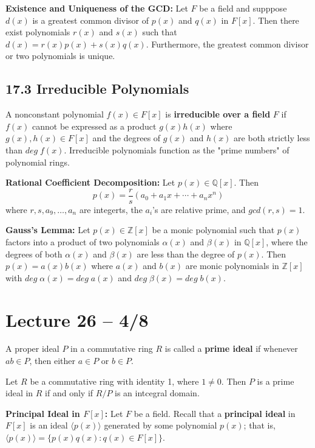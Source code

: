 \documentclass{article}
\newcommand{\Z}{\mathbb{Z}}
\newcommand{\Q}{\mathbb{Q}}
\begin{document}
\begin{theorem}
  \textbf{Existence and Uniqueness of the GCD: }Let $F$ be a field and supppose $d(x)$ is a greatest common divisor of $p(x)$ and $q(x)$ in $F[x]$. Then there exist polynomials $r(x)$ and $s(x)$ such that $d(x)=r(x)p(x)+s(x)q(x)$. Furthermore, the greatest common divisor or two polynomials is unique.
\end{theorem}

\subsection{17.3 Irreducible Polynomials}
A nonconstant polynomial $f(x)\in F[x]$ is \textbf{irreducible over a field} $F$ if $f(x)$ cannot be expressed as a product $g(x)h(x)$ where $g(x), h(x)\in F[x]$ and the degrees of $g(x)$ and $h(x)$ are both strictly less than $deg\;f(x)$. Irreducible polynomials function as the "prime numbers" of polynomial rings.

\begin{theorem}
  \textbf{Rational Coefficient Decomposition: }Let $p(x)\in\Q[x]$. Then \[p(x)=\frac{r}{s}(a_0+a_1x+\cdots+a_nx^n)\] where $r,s,a_9,\dots,a_n$ are integerts, the $a_i$'s are relative prime, and $gcd(r,s)=1$.
\end{theorem}

\begin{theorem}
  \textbf{Gauss's Lemma: }Let $p(x)\in\Z[x]$ be a monic polynomial such that $p(x)$ factors into a product of two polynomials $\alpha(x)$ and $\beta(x)$ in $\Q[x]$, where the degrees of both $\alpha(x)$ and $\beta(x)$ are less than the degree of $p(x)$. Then $p(x)=a(x)b(x)$ where $a(x)$ and $b(x)$ are monic polynomials in $\Z[x]$ with $deg\;\alpha(x)=deg\;a(x)$ and $deg\;\beta(x)=deg\;b(x)$.
\end{theorem}
\section{Lecture 26 -- 4/8}
A proper ideal $P$ in a commutative ring $R$ is called a \textbf{prime ideal} if whenever $ab\in P$, then either $a\in P$ or $b\in P$.

Let $R$ be a commutative ring with identity 1, where $1\neq0$. Then $P$ is a prime ideal in $R$ if and only if $R/P$ is an intcegral domain.

\textbf{Principal Ideal in $F[x]$:} Let $F$ be a field. Recall that a \textbf{principal ideal} in $F[x]$ is an ideal $\langle p(x)\rangle$ generated by some polynomial $p(x)$; that is, $\langle p(x)\rangle=\{p(x)q(x):q(x)\in F[x]\}$.
\end{document}
